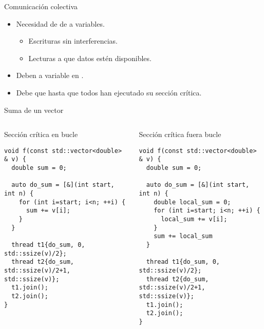\begin{frame}[t]{Comunicación colectiva}
\begin{itemize}
  \item Necesidad de  de  a variables.
    \begin{itemize}
      \item Escrituras sin interferencias.
      \item Lecturas  a que datos estén disponibles.
    \end{itemize}

  \item Deben  a variable en .

  \item Debe  que  
        hasta que todos han ejecutado su sección crítica.
  
\end{itemize}
\end{frame}

\begin{frame}[fragile]{Suma de un vector}
\begin{columns}[T]

\begin{block}{Sección crítica en bucle}
\begin{lstlisting}
void f(const std::vector<double> & v) {
  double sum = 0;
  
  auto do_sum = [&](int start, int n) {
    for (int i=start; i<n; ++i) {
      sum += v[i];
    }
  }

  thread t1{do_sum, 0, std::ssize(v)/2};
  thread t2{do_sum, std::ssize(v)/2+1, std::ssize(v)};
  t1.join();
  t2.join();
}
\end{lstlisting}
\end{block}


\begin{block}{Sección crítica fuera bucle}
\begin{lstlisting}
void f(const std::vector<double> & v) {
  double sum = 0;
  
  auto do_sum = [&](int start, int n) {
    double local_sum = 0;
    for (int i=start; i<n; ++i) {
      local_sum += v[i];
    }
    sum += local_sum
  }

  thread t1{do_sum, 0, std::ssize(v)/2};
  thread t2{do_sum, std::ssize(v)/2+1, std::ssize(v)};
  t1.join();
  t2.join();
}
\end{lstlisting}
\end{block}

\end{columns}
\end{frame}
